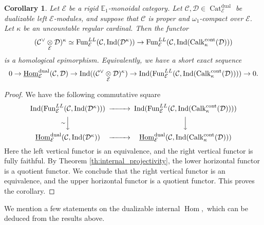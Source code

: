 \documentclass[11pt,leqno]{amsart}
\newtheorem{cor}[theo]{Corollary}
\numberwithin{equation}{section}
\def\Hom{\operatorname{Hom}}
\newcommand{\tens}[1]{%
  \mathbin{\mathop{\otimes}\displaylimits_{#1}}%
}
\newcommand{\Cat}{\operatorname{Cat}}
\newcommand{\cont}{\operatorname{cont}}
\newcommand{\dual}{\operatorname{dual}}
\newcommand{\bE}{{\mathbb E}}
\newcommand{\cD}{{\mathcal D}}
\newcommand{\cC}{{\mathcal C}}
\newcommand{\cE}{{\mathcal E}}
\newcommand{\un}{\underline}
\newcommand{\Fun}{\operatorname{Fun}}
\newcommand{\Ind}{\operatorname{Ind}}
\newcommand{\Calk}{\operatorname{Calk}}
\begin{document}
\begin{cor}\label{cor:hom_epi_internal_hom}
Let $\cE$ be a rigid $\bE_1$-monoidal category. Let $\cC,\cD\in\Cat_{\cE}^{\dual}$ be dualizable left $\cE$-modules, and suppose that $\cC$ is proper and $\omega_1$-compact over $\cE.$ Let $\kappa$ be an uncountable regular cardinal. Then the functor
\begin{equation*}
(\cC^{\vee}\tens{\cE}\cD)^{\kappa}\simeq \Fun_{\cE}^{LL}(\cC,\Ind(\cD^{\kappa}))\to \Fun_{\cE}^{LL}(\cC,\Ind(\Calk_{\kappa}^{\cont}(\cD)))
\end{equation*}
is a homological epimorphism. Equivalently, we have a short exact sequence
\begin{equation*}
0\to\un{\Hom}_{\cE}^{\dual}(\cC,\cD)\to \Ind((\cC^{\vee}\tens{\cE}\cD)^{\kappa})\to \Ind(\Fun_{\cE}^{LL}(\cC,\Ind(\Calk_{\kappa}^{\cont}(\cD))))\to 0.
\end{equation*}
\end{cor}

\begin{proof}
We have the following commutative square
\begin{equation*}
\begin{CD}
\Ind(\Fun_{\cE}^{LL}(\cC,\Ind(\cD^{\kappa}))) @>>> \Ind(\Fun_{\cE}^{LL}(\cC,\Ind(\Calk_{\kappa}^{\cont}(\cD))))\\
@V{\sim}VV @VVV\\
\un{\Hom}_{\cE}^{\dual}(\cC,\Ind(\cD^{\kappa})) @>>> \un{\Hom}_{\cE}^{\dual}(\cC,\Ind(\Calk_{\kappa}^{\cont}(\cD)))
\end{CD}
\end{equation*}
Here the left vertical functor is an equivalence, and the right vertical functor is fully faithful. By Theorem \ref{th:internal_projectivity}, the lower horizontal functor is a quotient functor. We conclude that the right vertical functor is an equivalence, and the upper horizontal functor is a quotient functor. This proves the corollary. 
\end{proof}

We mention a few statements on the dualizable internal $\Hom,$ which can be deduced from the results above.
\end{document}
